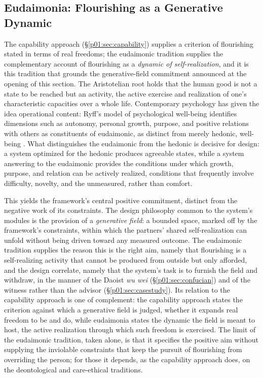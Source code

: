 \documentclass[11pt,a4paper]{article}
\begin{document}
\subsection{Eudaimonia: Flourishing as a Generative Dynamic}\label{p01:sec:eudaimonia}

The capability approach (§\ref{p01:sec:capability}) supplies a criterion of flourishing stated in terms of real freedoms; the eudaimonic tradition supplies the complementary account of flourishing as a \emph{dynamic of self-realization}, and it is this tradition that grounds the generative-field commitment announced at the opening of this section. The Aristotelian root holds that the human good is not a state to be reached but an activity, the active exercise and realization of one's characteristic capacities over a whole life. Contemporary psychology has given the idea operational content: Ryff's model of psychological well-being identifies dimensions such as autonomy, personal growth, purpose, and positive relations with others as constituents of eudaimonic, as distinct from merely hedonic, well-being \parencite{ryff1995structure}. What distinguishes the eudaimonic from the hedonic is decisive for design: a system optimized for the hedonic produces agreeable states, while a system answering to the eudaimonic provides the conditions under which growth, purpose, and relation can be actively realized, conditions that frequently involve difficulty, novelty, and the unmeasured, rather than comfort.

This yields the framework's central positive commitment, distinct from the negative work of its constraints. The design philosophy common to the system's modules is the provision of a \emph{generative field}: a bounded space, marked off by the framework's constraints, within which the partners' shared self-realization can unfold without being driven toward any measured outcome. The eudaimonic tradition supplies the reason this is the right aim, namely that flourishing is a self-realizing activity that cannot be produced from outside but only afforded, and the design correlate, namely that the system's task is to furnish the field and withdraw, in the manner of the Daoist \emph{wu wei} (§\ref{p01:sec:confucian}) and of the witness rather than the advisor (§\ref{p01:sec:casestudy}). Its relation to the capability approach is one of complement: the capability approach states the criterion against which a generative field is judged, whether it expands real freedom to be and do, while eudaimonia states the dynamic the field is meant to host, the active realization through which such freedom is exercised. The limit of the eudaimonic tradition, taken alone, is that it specifies the positive aim without supplying the inviolable constraints that keep the pursuit of flourishing from overriding the person; for those it depends, as the capability approach does, on the deontological and care-ethical traditions.
\end{document}

